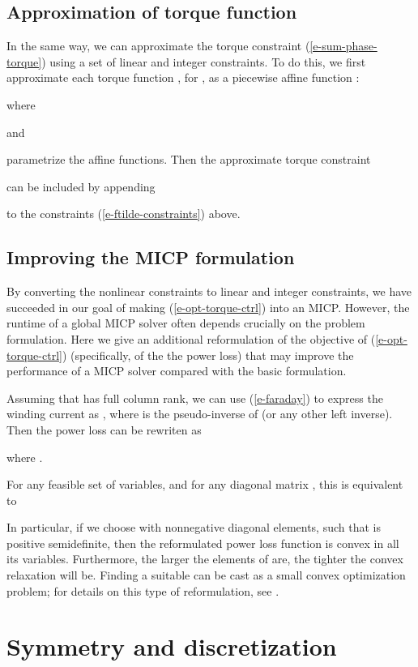 \documentclass[11pt]{article}
\begin{document}
\subsection{Approximation of torque function}
In the same way, we can approximate the torque constraint
(\ref{e-sum-phase-torque})
using a set of linear and integer constraints.
To do this, we first approximate 
each torque function , for ,
as a piecewise affine function :

where 

and

parametrize the affine functions.
Then the approximate torque constraint 

can be included by appending

to the constraints (\ref{e-ftilde-constraints}) above.




\subsection{Improving the MICP formulation}
By converting the nonlinear constraints to linear and integer constraints,
we have succeeded in our goal of making (\ref{e-opt-torque-ctrl})
into an MICP.
However, the runtime of a global MICP solver often depends crucially on the problem formulation.
Here we give an additional reformulation of the objective of 
(\ref{e-opt-torque-ctrl})
(specifically, of the the power loss)
that may improve the performance of a MICP solver
compared with the basic formulation.



Assuming that  has full column rank, 
we can use (\ref{e-faraday}) to express the winding current as 
,
where  is the pseudo-inverse of 
(or any other left inverse).
Then the power loss can be rewriten as

where .

For any feasible set of variables,
and for any diagonal matrix , this is equivalent to

In particular, if we choose  with nonnegative diagonal elements,
such that  is positive semidefinite,
then the reformulated power loss function is convex in all its variables.
Furthermore, the larger the elements of  are,
the tighter the convex relaxation will be.
Finding a suitable  can be cast as a small convex optimization problem;
for details on this type of reformulation, see \cite{frangioni2007sdp}.


\section{Symmetry and discretization}
\end{document}

